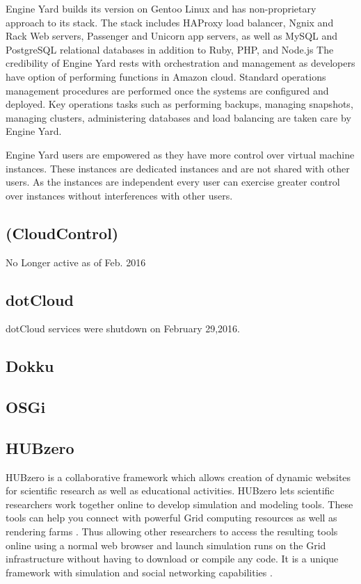     Engine Yard builds its version on Gentoo Linux and has
    non-proprietary approach to its stack. The stack includes HAProxy
    load balancer, Ngnix and Rack Web servers, Passenger and Unicorn
    app servers, as well as MySQL and PostgreSQL relational databases
    in addition to Ruby, PHP, and Node.js The credibility of Engine
    Yard rests with orchestration and management as developers have
    option of performing functions in Amazon cloud. Standard
    operations management procedures are performed once the systems
    are configured and deployed. Key operations tasks such as
    performing backups, managing snapshots, managing clusters,
    administering databases and load balancing are taken care by
    Engine Yard.
    
    Engine Yard users are empowered as they have more control over
    virtual machine instances. These instances are dedicated instances
    and are not shared with other users. As the instances are
    independent every user can exercise greater control over instances
    without interferences with other users.

\subsection{(CloudControl)}

    No Longer active as of Feb. 2016 \cite{www-wiki}

\subsection{dotCloud \cite{www-dotCloud}}

    dotCloud services were shutdown on February 29,2016.
    

\subsection{Dokku}
\subsection{OSGi}
\subsection{ HUBzero}
     
     HUBzero is a collaborative framework which allows creation of
     dynamic websites for scientific research as well as educational
     activities.  HUBzero lets scientific researchers work together
     online to develop simulation and modeling tools.  These tools can
     help you connect with powerful Grid computing resources as well
     as rendering farms \cite{hubzerowebsite}. Thus allowing other
     researchers to access the resulting tools online using a normal
     web browser and launch simulation runs on the Grid infrastructure
     without having to download or compile any code. It is a unique
     framework with simulation and social networking
     capabilities \cite{hubzeropaper2010}.

